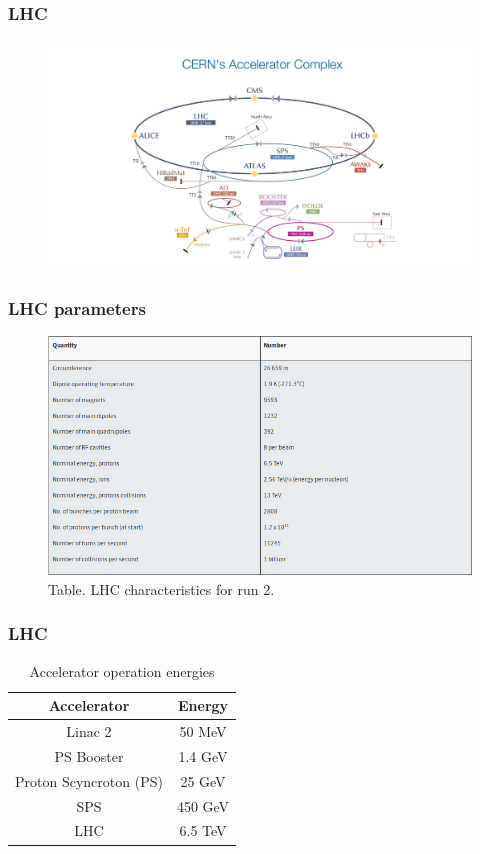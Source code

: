 \documentclass[11pt]{beamer}
\begin{document}
\begin{frame}
\frametitle{LHC}
\begin{center}
	\begin{figure}
	\includegraphics[scale=0.25]{figures/CERN's-accelerator-complex2013.jpg}
	\end{figure}
\end{center}
\end{frame}



\begin{frame}
\frametitle{LHC parameters}
\begin{center}
	\begin{figure}
		\includegraphics[scale=0.5]{figures/lhc-t.png}
		\caption*{Table. LHC characteristics for run 2.}
	\end{figure}
\end{center}
\end{frame}


\begin{frame}
\frametitle{LHC}
\begin{table}
	\caption*{Accelerator operation energies}
	\begin{tabular}{|c|c|}
		\hline
		Accelerator & Energy \\
		\hline
		Linac 2 &  50 MeV \\
		\hline
		PS Booster & 1.4 GeV \\
		\hline
		Proton Scyncroton (PS) & 25 GeV\\
		\hline
		SPS &  450 GeV\\
		\hline
		LHC & 6.5 TeV\\
		\hline
	\end{tabular}
\end{table}
\end{frame}
\end{document}
